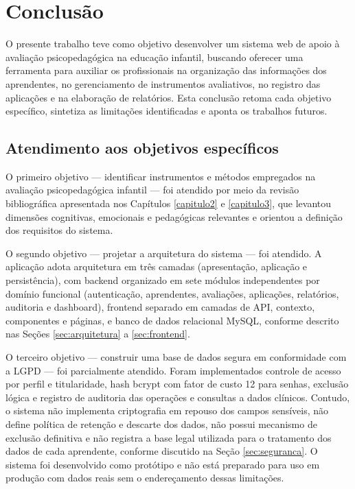 \chapter[Conclusão]{Conclusão} \label{capitulo16}

O presente trabalho teve como objetivo desenvolver um sistema web de apoio à avaliação psicopedagógica na educação infantil, buscando oferecer uma ferramenta para auxiliar os profissionais na organização das informações dos aprendentes, no gerenciamento de instrumentos avaliativos, no registro das aplicações e na elaboração de relatórios. Esta conclusão retoma cada objetivo específico, sintetiza as limitações identificadas e aponta os trabalhos futuros.

\section{Atendimento aos objetivos específicos}

O primeiro objetivo — identificar instrumentos e métodos empregados na avaliação psicopedagógica infantil — foi atendido por meio da revisão bibliográfica apresentada nos Capítulos \ref{capitulo2} e \ref{capitulo3}, que levantou dimensões cognitivas, emocionais e pedagógicas relevantes e orientou a definição dos requisitos do sistema.

O segundo objetivo — projetar a arquitetura do sistema — foi atendido. A aplicação adota arquitetura em três camadas (apresentação, aplicação e persistência), com backend organizado em sete módulos independentes por domínio funcional (autenticação, aprendentes, avaliações, aplicações, relatórios, auditoria e dashboard), frontend separado em camadas de API, contexto, componentes e páginas, e banco de dados relacional MySQL, conforme descrito nas Seções \ref{sec:arquitetura} a \ref{sec:frontend}.

O terceiro objetivo — construir uma base de dados segura em conformidade com a LGPD — foi parcialmente atendido. Foram implementados controle de acesso por perfil e titularidade, hash bcrypt com fator de custo 12 para senhas, exclusão lógica e registro de auditoria das operações e consultas a dados clínicos. Contudo, o sistema não implementa criptografia em repouso dos campos sensíveis, não define política de retenção e descarte dos dados, não possui mecanismo de exclusão definitiva e não registra a base legal utilizada para o tratamento dos dados de cada aprendente, conforme discutido na Seção \ref{sec:seguranca}. O sistema foi desenvolvido como protótipo e não está preparado para uso em produção com dados reais sem o endereçamento dessas limitações.

